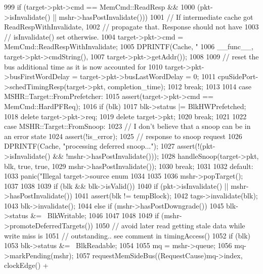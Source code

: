 \begin{DoxyCode}
{{{999             if (target->pkt->cmd == MemCmd::ReadResp &&
1000                 (pkt->isInvalidate() || mshr->hasPostInvalidate())) {
1001                 // If intermediate cache got ReadRespWithInvalidate,
1002                 // propagate that.  Response should not have
1003                 // isInvalidate() set otherwise.
1004                 target->pkt->cmd = MemCmd::ReadRespWithInvalidate;
1005                 DPRINTF(Cache, "%
1006                         __func__, target->pkt->cmdString(),
1007                         target->pkt->getAddr());
1008             }
1009             // reset the bus additional time as it is now accounted for
1010             target->pkt->busFirstWordDelay = target->pkt->busLastWordDelay = 0;
1011             cpuSidePort->schedTimingResp(target->pkt, completion_time);
1012             break;
1013 
1014           case MSHR::Target::FromPrefetcher:
1015             assert(target->pkt->cmd == MemCmd::HardPFReq);
1016             if (blk)
1017                 blk->status |= BlkHWPrefetched;
1018             delete target->pkt->req;
1019             delete target->pkt;
1020             break;
1021 
1022           case MSHR::Target::FromSnoop:
1023             // I don't believe that a snoop can be in an error state
1024             assert(!is_error);
1025             // response to snoop request
1026             DPRINTF(Cache, "processing deferred snoop...\n");
1027             assert(!(pkt->isInvalidate() && !mshr->hasPostInvalidate()));
1028             handleSnoop(target->pkt, blk, true, true,
1029                         mshr->hasPostInvalidate());
1030             break;
1031 
1032           default:
1033             panic("Illegal target->source enum %
1034         }
1035 
1036         mshr->popTarget();
1037     }
1038 
1039     if (blk && blk->isValid()) {
1040         if (pkt->isInvalidate() || mshr->hasPostInvalidate()) {
1041             assert(blk != tempBlock);
1042             tags->invalidate(blk);
1043             blk->invalidate();
1044         } else if (mshr->hasPostDowngrade()) {
1045             blk->status &= ~BlkWritable;
1046         }
1047     }
1048 
1049     if (mshr->promoteDeferredTargets()) {
1050         // avoid later read getting stale data while write miss is
1051         // outstanding.. see comment in timingAccess()
1052         if (blk) {
1053             blk->status &= ~BlkReadable;
1054         }
1055         mq = mshr->queue;
1056         mq->markPending(mshr);
1057         requestMemSideBus((RequestCause)mq->index, clockEdge() +
}}
\end{DoxyCode}
